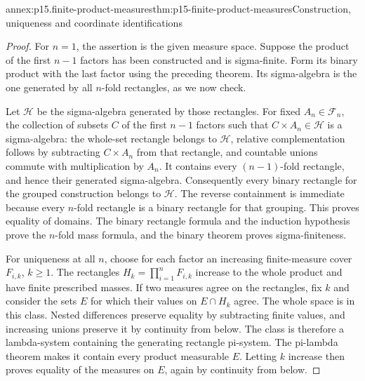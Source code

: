 \begin{annexitem}{annex:p15.finite-product-measures}{thm:p15-finite-product-measures}{Construction, uniqueness and coordinate identifications}
\begin{proof}
For \(n=1\), the assertion is the given measure space. Suppose the
product of the first \(n-1\) factors has been constructed and is
sigma-finite. Form its binary product with the last factor using the
preceding theorem. Its sigma-algebra is the one generated by all
\(n\)-fold rectangles, as we now check.

Let \(\mathcal H\) be the sigma-algebra generated by those rectangles.
For fixed \(A_n\in\mathcal F_n\), the collection of subsets \(C\)
of the first \(n-1\) factors such that \(C\times A_n\in\mathcal H\)
is a sigma-algebra: the whole-set rectangle belongs to \(\mathcal H\),
relative complementation follows by subtracting \(C\times A_n\)
from that rectangle, and countable unions commute with multiplication
by \(A_n\). It contains every \((n-1)\)-fold rectangle, and hence
their generated sigma-algebra. Consequently every binary rectangle
for the grouped construction belongs to \(\mathcal H\). The reverse
containment is immediate because every \(n\)-fold rectangle is a
binary rectangle for that grouping. This proves equality of domains.
The binary rectangle formula and the induction hypothesis prove the
\(n\)-fold mass formula, and the binary theorem proves sigma-finiteness.

For uniqueness at all \(n\), choose for each factor an increasing
finite-measure cover \(F_{i,k}\), \(k\geq1\). The rectangles
\(H_k=\prod_{i=1}^n F_{i,k}\) increase to the whole product and have
finite prescribed masses. If two measures agree on the rectangles,
fix \(k\) and consider the sets \(E\) for which their values on
\(E\cap H_k\) agree. The whole space is in this class. Nested
differences preserve equality by subtracting finite values, and increasing
unions preserve it by continuity from below. The class is therefore a
lambda-system containing the generating rectangle pi-system. The
pi-lambda theorem makes it contain every product measurable \(E\).
Letting \(k\) increase then proves equality of the measures on \(E\),
again by continuity from below.


\end{proof}
\end{annexitem}

